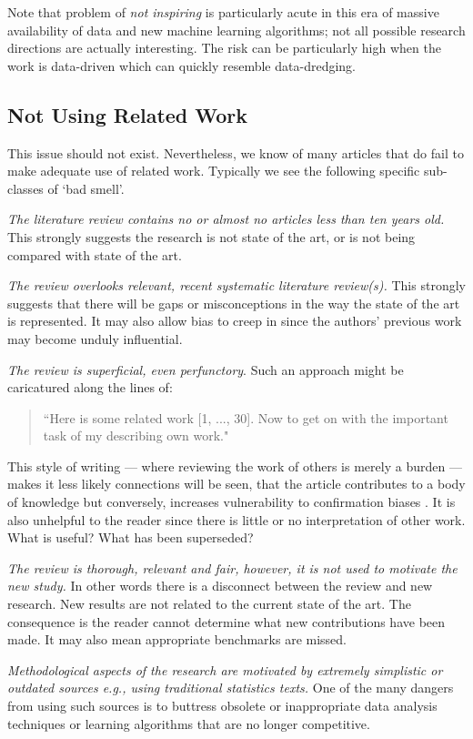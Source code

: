 \documentclass[preprint,10pt]{elsarticle}
\begin{document}
Note that problem of {\em not inspiring} is particularly acute in this era of massive availability of data and new machine learning algorithms; not all possible research directions are actually interesting.  The risk can be particularly high when the work is data-driven which can quickly resemble data-dredging.


\subsection{Not Using Related Work}
This issue should not exist. Nevertheless, we know of many articles that do fail to make adequate use of related work. Typically we see the following specific sub-classes of `bad smell'.

 {\em The literature review contains no or almost no articles less than ten years old.}  This strongly suggests the research is not state of the art, or is not being compared with state of the art.

{\em The review overlooks relevant, recent systematic literature review(s).}  This strongly suggests that there will be gaps or misconceptions in the way the state of the art is represented.  It may also allow bias to creep in since the authors' previous work may become unduly influential.

{\em The review is superficial, even perfunctory}. Such an approach might be caricatured along the lines of: \begin{quote}
    ``Here is some related work [1, ..., 30].  Now to get on with the important task of my describing own work."
\end{quote}
This style of writing --- where reviewing the work of others is merely a burden --- makes it less likely connections will be seen, that the article contributes to a body of knowledge but conversely, increases vulnerability to confirmation biases \cite{Nick98}.  It is also unhelpful to the reader since there is little or no interpretation of other work.  What is useful?  What has been superseded?

{\em The review is thorough, relevant and fair, however, it is not used to motivate the new study. } In other words there is a disconnect between the review  and new research. New results are not related to the current state of the art.  The consequence is the reader cannot determine what new contributions have been made.  It may also mean appropriate benchmarks are missed.

{\em Methodological aspects of the research are motivated by extremely simplistic or outdated sources e.g., using traditional statistics texts. }  One of the many dangers from using such sources is to buttress obsolete or inappropriate data analysis techniques or learning algorithms that are no longer competitive.
\end{document}

